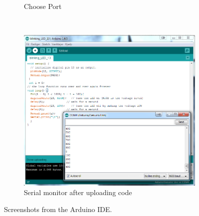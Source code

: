 \begin{figure}[!h]
\begin{subfigure}{0.47\linewidth}
		\caption{Choose Port}
		\label{fig:choose_port}
	\end{subfigure}\\[1ex]
	\begin{subfigure}{\linewidth}
		\centering
		\includegraphics[width=0.47\linewidth]{Figures/SerialMonitor}
		\caption{Serial monitor after uploading code}
		\label{fig:serial_monitor}
	\end{subfigure}
	\caption{Screenshots from the Arduino IDE.}
	\label{fig:ArduinoScreenshots}
\end{figure}

